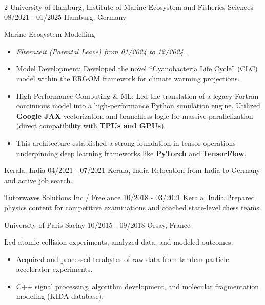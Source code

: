 \documentclass{thejus_cv}
\begin{document}
\begin{paracol}{2}
             {University of Hamburg, Institute of Marine Ecosystem and Fisheries Sciences}
             {08/2021 - 01/2025}
             {Hamburg, Germany}
             {Marine Ecosystem Modelling
             \begin{itemize}
                 \item \textit{Elternzeit (Parental Leave) from 01/2024 to 12/2024.}
                 \item Model Development: Developed the novel ``Cyanobacteria Life Cycle'' (CLC) model within the ERGOM framework for climate warming projections.
                 \item High-Performance Computing \& ML: Led the translation of a legacy Fortran continuous model into a high-performance Python simulation engine. Utilized \textbf{Google JAX} vectorization and branchless logic for massive parallelization (direct compatibility with \textbf{TPUs and GPUs}).
                 \item This architecture established a strong foundation in tensor operations underpinning deep learning frameworks like \textbf{PyTorch} and \textbf{TensorFlow}.
             \end{itemize}}

             {Kerala, India}
             {04/2021 - 07/2021}
             {Kerala, India}
             {Relocation from India to Germany and active job search.}

             {Tutorwaves Solutions Inc / Freelance}
             {10/2018 - 03/2021}
             {Kerala, India}
             {Prepared physics content for competitive examinations and coached state-level chess teams.}

             {University of Paris-Saclay}
             {10/2015 - 09/2018}
             {Orsay, France}
             {Led atomic collision experiments, analyzed data, and modeled outcomes.
             \begin{itemize}
                 \item Acquired and processed terabytes of raw data from tandem particle accelerator experiments.
                 \item C++ signal processing, algorithm development, and molecular fragmentation modeling (KIDA database).
             \end{itemize}}




\end{paracol}
\end{document}
